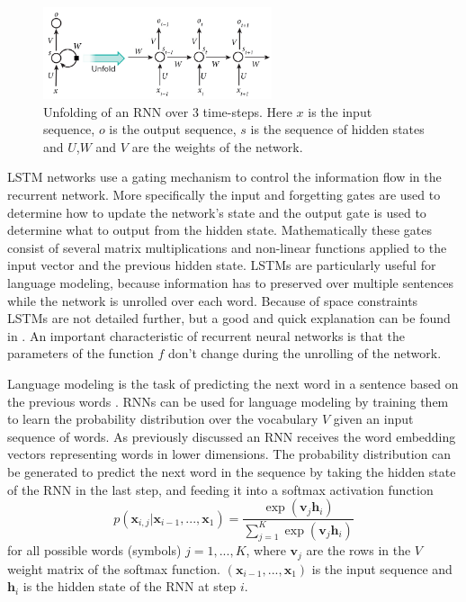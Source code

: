 \documentclass[12pt]{article}
\begin{document}
\begin{figure}[H]
	\centering
	\includegraphics[width=0.6\textwidth]{pics/rnn.jpg}
	\caption{Unfolding of an RNN over 3 time-steps. Here \(x\) is the input sequence, \(o\) is the output sequence, \(s\) is the sequence of hidden states and \(U\),\(W\) and \(V\) are the weights of the network. \cite{RNN_pic:2017}}
	\label{fig:231}
\end{figure}
LSTM networks use a gating mechanism to control the information flow in the recurrent network. More specifically the input and forgetting gates are used to determine how to update the network's state and the output gate is used to determine what to output from the hidden state. Mathematically these gates consist of several matrix multiplications and non-linear functions applied to the input vector and the previous hidden state. LSTMs are particularly useful for language modeling, because information has to preserved over multiple sentences while the network is unrolled over each word. Because of space constraints LSTMs are not detailed further, but a good and quick explanation can be found in \cite{LSTM_article}. An important characteristic of recurrent neural networks is that the parameters of the function \(f\) don't change during the unrolling of the network.

Language modeling is the task of predicting the next word in a sentence based on the previous words \cite{Bengio:2003}. RNNs can be used for language modeling by training them to learn the probability distribution over the vocabulary \({V}\) given an input sequence of words. As previously discussed an RNN receives the word embedding vectors representing words in lower dimensions. The probability distribution can be generated to predict the next word in the sequence by taking the hidden state of the RNN in the last step, and feeding it into a softmax activation function
\begin{equation} \label{eq231b}
p(\bm{x}_{i,j}|\bm{x}_{i-1},...,\bm{x}_1)=\frac{\exp(\bm{v}_j\bm{h}_i)}{\sum_{j=1}^{K}\exp(\bm{v}_{j}\bm{h}_i)}
\end{equation}
for all possible words (symbols) \(j=1,...,K\), where \(\bm{v}_j\) are the rows in the \(V\) weight matrix of the softmax function. \((\bm{x}_{i-1},...,\bm{x}_1)\) is the input sequence and \(\bm{h}_i\) is the hidden state of the RNN at step \(i\).
\end{document}

